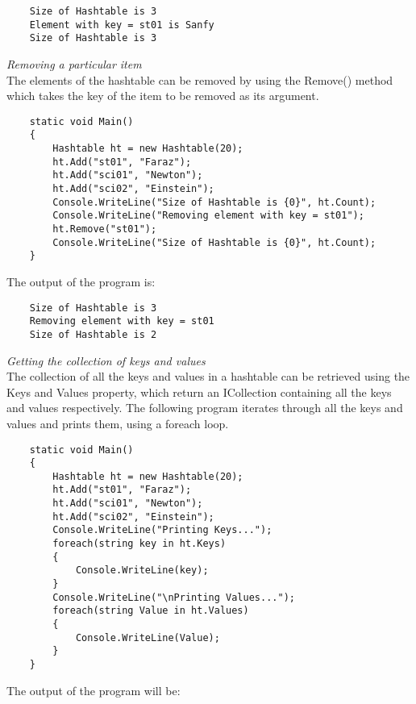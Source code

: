 \begin{lstlisting}
    Size of Hashtable is 3
    Element with key = st01 is Sanfy
    Size of Hashtable is 3        
\end{lstlisting}

\emph{Removing a particular item}\\

The elements of the hashtable can be removed by using the Remove() method which takes the key of the item to be
removed as its argument.

\begin{lstlisting}
    static void Main()
    {
        Hashtable ht = new Hashtable(20);
        ht.Add("st01", "Faraz");
        ht.Add("sci01", "Newton");
        ht.Add("sci02", "Einstein");
        Console.WriteLine("Size of Hashtable is {0}", ht.Count);
        Console.WriteLine("Removing element with key = st01");
        ht.Remove("st01");
        Console.WriteLine("Size of Hashtable is {0}", ht.Count);
    }    
\end{lstlisting}

The output of the program is:

\begin{lstlisting}
    Size of Hashtable is 3
    Removing element with key = st01
    Size of Hashtable is 2        
\end{lstlisting}

\emph{Getting the collection of keys and values}\\

The collection of all the keys and values in a hashtable can be retrieved using the Keys and Values property, which
return an ICollection containing all the keys and values respectively. The following program iterates through all
the keys and values and prints them, using a foreach loop.

\begin{lstlisting}
    static void Main()
    {
        Hashtable ht = new Hashtable(20);
        ht.Add("st01", "Faraz");
        ht.Add("sci01", "Newton");
        ht.Add("sci02", "Einstein");
        Console.WriteLine("Printing Keys...");
        foreach(string key in ht.Keys)
        {
            Console.WriteLine(key);
        }
        Console.WriteLine("\nPrinting Values...");
        foreach(string Value in ht.Values)
        {
            Console.WriteLine(Value);
        }
    }   
\end{lstlisting}
 
The output of the program will be:

